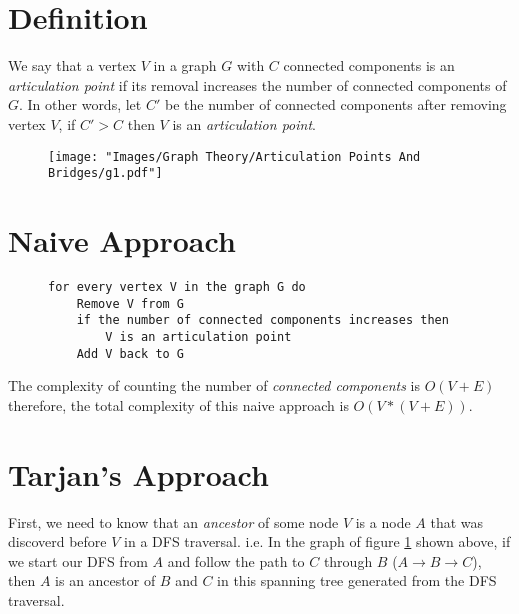 \vspace*{2em}
\section*{Definition}
We say that a vertex $V$ in a graph $G$ with $C$
connected components is an \textit{articulation point} if its removal increases the number of connected components of $G$.
In other words, let $C'$ be the number of connected components after removing vertex $V$, if $C' > C$ then $V$ is an \textit{articulation point}.

\begin{figure}[H]
  \centering
  \texttt{[image: "Images/Graph Theory/Articulation Points And Bridges/g1.pdf"]}
  \caption{}
  \label{fig:apb_g1}
\end{figure}

\section*{Naive Approach}

\begin{figure}[thp]
  \centering
  \begin{minipage}[c]{0.9\textwidth}
    \begin{verbatim}
for every vertex V in the graph G do
    Remove V from G
    if the number of connected components increases then
        V is an articulation point
    Add V back to G
      \end{verbatim}
  \end{minipage}
\end{figure}

The complexity of counting the number of \textit{connected components} is $O(V + E)$ therefore,
the total complexity of this naive approach is $O(V * (V + E))$.

\section*{Tarjan's Approach}

First, we need to know that an \textit{ancestor} of some node $V$ is a node $A$ that was discoverd
before $V$ in a DFS traversal. i.e. In the graph of figure \ref{fig:apb_g1} shown above, if we start
our DFS from $A$ and follow the path to $C$ through $B$ ($A \rightarrow B \rightarrow C$), then $A$
is an ancestor of $B$ and $C$ in this spanning tree generated from the DFS traversal.\\

